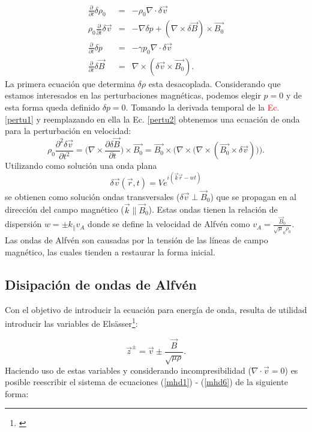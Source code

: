 \documentclass[a4paper,11pt]{report}
\begin{document}
\begin{eqnarray}
  \frac{\partial}{\partial t} \delta \rho_0 &=& - \rho_0 \nabla \cdot \delta \vec{v}\\
  \rho_0 \frac{\partial}{\partial t} \delta \vec{v} &=& -\nabla \delta p + (\nabla \times \delta \vec{B})\times \vec{B_0} \label{pertu1}\\
  \frac{\partial}{\partial t} \delta p &=& -\gamma p_0 \nabla \cdot \delta \vec{v}\\
  \frac{\partial}{\partial t} \delta \vec{B} &=& \nabla \times (\delta \vec{v}\times \vec{B_0}) \label{pertu2}.  
\end{eqnarray}
La primera ecuación que determina $\delta \rho$ esta desacoplada. Considerando que estamos interesados en las perturbaciones magnéticas, podemos elegir $p=0$ y de esta forma queda definido $\delta p=0$. Tomando la derivada temporal de la \textcolor{red}{Ec. \ref{pertu1}} y reemplazando en ella la Ec. \ref{pertu2} obtenemos una ecuación de onda para la perturbación en velocidad:
\begin{equation}
  \rho_0 \frac{\partial^2 \delta \vec{v}}{\partial t^2}=\Bigg(\nabla \times \frac{\partial \delta \vec{B}}{\partial t} \Bigg) \times \vec{B_0}= \vec{B_0} \times \Bigg( \nabla \times \Bigg( \nabla \times (\vec{B_0}\times \delta \vec{v}) \Bigg) \Bigg).
\end{equation}
Utilizando como solución una onda plana
\begin{equation}
  \delta \vec{v}(\vec{r},t)=V e^{i(\vec{k}\vec{r}-wt)}
\end{equation}
se obtienen como solución ondas transversales ($\delta\vec{v}\perp \vec{B}_0$) que se propagan en al dirección del campo magnético ($\vec{k} \parallel \vec{B}_0$). Estas ondas tienen la relación de dispersión $w=\pm k_{\parallel} v_A$  donde se define la velocidad de Alfvén como  $v_A=\frac{\vec{B}_0}{\sqrt \mu_0 \rho_0}$. Las ondas de Alfvén son causadas por la tensión de las líneas de campo magnético, las cuales tienden a restaurar la forma inicial.


\subsection{Disipación de ondas de Alfvén}

Con el objetivo de introducir la ecuación para energía de onda, resulta de utilidad introducir las variables de Elsässer\footnote{\citet{elsasser_1950}}:

\begin{equation}
  \vec{z}^\pm = \vec{v} \pm \frac{\vec{B}}{\sqrt{\mu \rho}}.
\end{equation}
Haciendo uso de estas variables y considerando incompresibilidad ($\nabla \cdot \vec{v}=0$) es posible reescribir el sistema de ecuaciones (\ref{mhd1}) - (\ref{mhd6}) de la siguiente forma:
\end{document}
